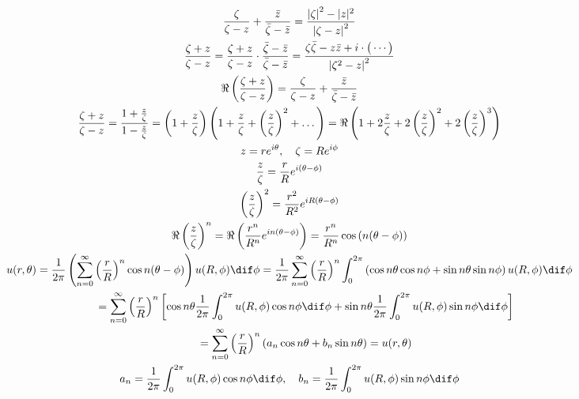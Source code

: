\documentclass[12pt,a4paper,notitlepage,fleqn]{article}
\begin{document}
    \begin{gather*}
    	\frac{\zeta}{\zeta-z} + \frac{\bar z}{\bar \zeta - \bar z}
    	= \frac{\left|\zeta\right|^2-|z|^2}{\left|\zeta-z\right|^2} \\
        \frac{\zeta+z}{\zeta - z} 
        = \frac{\zeta+z}{\zeta - z}\cdot\frac{\bar\zeta-\bar z}{\bar \zeta - \bar z}   
        = \frac{\zeta\bar\zeta-z\bar z +i \cdot \big( \cdots
        	 \big)}{\left|\zeta^2-z\right|^2} 	\\
        \Re\left(\frac{\zeta+z}{\zeta-z}\right)
        =\frac{\zeta}{\zeta - z} + \frac{\bar z}{\bar\zeta - \bar z}
        \\
        \frac{\zeta + z}{\zeta - z} = \frac{1+\frac{z}{\zeta}}{1-\frac{z}{\zeta}}
        = \left(1+\frac{z}{\zeta}\right)\left(1+\frac{z}{\zeta}
        +\left(\frac{z}{\zeta}\right)^2+\dots
        \right)
        = \Re\left(
        1+2\frac{z}{\zeta}+2\left(\frac{z}{\zeta}\right)^2
        +2\left(\frac{z}{\zeta}\right)^3
        \right)
        \\
        z=re^{i\theta}, \quad \zeta = Re^{i\phi} \\
        \frac{z}{\zeta} = \frac{r}{R} e^{i(\theta-\phi)} \\
        \left(\frac{z}{\zeta}\right)^2 = \frac{r^2}{R^2}
        e^{iR(\theta-\phi)} \\
        \Re\left(\frac{z}{\zeta}\right)^n
        = \Re\left(
        \frac{r^n}{R^n}e^{in(\theta-\phi)}
        \right) = \frac{r^n}{R^n}\cos\left(n(\theta-\phi)\right)
        \\
        u(r,\theta) = \frac{1}{2\pi}
        \left(
        \sum_{n=0}^\infty \left(\frac{r}{R}\right)^n
        \cos n(\theta-\phi)
        \right) u(R,\phi)\dif\phi
        = \frac{1}{2\pi} \sum_{n=0}^{\infty} \left(\frac{r}{R}\right)^n
        \int_0^{2\pi} \left(\cos n\theta\cos n\phi + \sin n\theta\sin n\phi
        \right) u(R,\phi)\dif \phi
        \\ \hphantom{u(r,\theta)} =
        \sum_{n=0}^{\infty} \left(\frac{r}{R}\right)^n
        \left[\cos n\theta \frac{1}{2\pi}
        \int_{0}^{2\pi} u(R,\phi) \cos n\phi \dif\phi
        + \sin n\theta \frac{1}{2\pi} \int_{0}^{2\pi}
        u(R,\phi) \sin n\phi \dif\phi
        \right]
        \\ \hphantom{u(r,\theta)} = 
        \sum_{n=0}^{\infty} \left( \frac{r}{R} \right)^n
        (
        a_n\cos n\theta +b_n\sin n\theta
        ) = u(r,\theta)
        \\
        a_n = \frac{1}{2\pi} \int_{0}^{2\pi} u(R,\phi) \cos n\phi\dif\phi,
        \quad
        b_n = \frac{1}{2\pi} \int_{0}^{2\pi} u(R,\phi) \sin n\phi\dif\phi
    \end{gather*}
    
\end{document}

